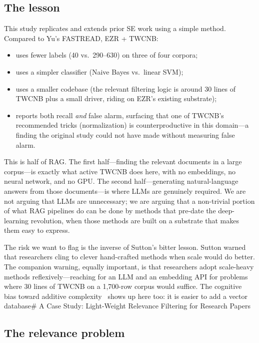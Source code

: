 \documentclass[AMA,STIX2COL]{WileyNJDv5}
\begin{document}
{\subsection*{The lesson}

This study replicates and extends prior SE work using a
simple method. Compared to Yu's FASTREAD, EZR + TWCNB:
\begin{itemize}
\item uses fewer labels (40 vs.\ 290--630) on three of four
corpora;
\item uses a simpler classifier (Naive Bayes vs.\ linear SVM);
\item uses a smaller codebase (the relevant filtering logic
is around 30 lines of TWCNB plus a small driver, riding on
EZR's existing substrate);
\item reports both recall {\em and} false alarm, surfacing
that one of TWCNB's recommended tricks (normalization) is
counterproductive in this domain---a finding the original
study could not have made without measuring false alarm.
\end{itemize}

This is half of RAG. The first half---finding the relevant
documents in a large corpus---is exactly what active TWCNB
does here, with no embeddings, no neural network, and no
GPU. The second half---generating natural-language answers
from those documents---is where LLMs are genuinely required.
We are not arguing that LLMs are unnecessary; we are arguing
that a non-trivial portion of what RAG pipelines do can be
done by methods that pre-date the deep-learning revolution,
when those methods are built on a substrate that makes them
easy to express.

The risk we want to flag is the inverse of Sutton's bitter
lesson. Sutton warned that researchers cling to clever
hand-crafted methods when scale would do better. The
companion warning, equally important, is that researchers
adopt scale-heavy methods reflexively---reaching for an LLM
and an embedding API for problems where 30 lines of TWCNB
on a 1{,}700-row corpus would suffice. The cognitive bias
toward additive complexity~\cite{Fillon25,adams2021people}
shows up here too: it is easier to add a vector database# A Case Study: Light-Weight Relevance Filtering for Research Papers

\subsection*{The relevance problem}

}
\end{document}
